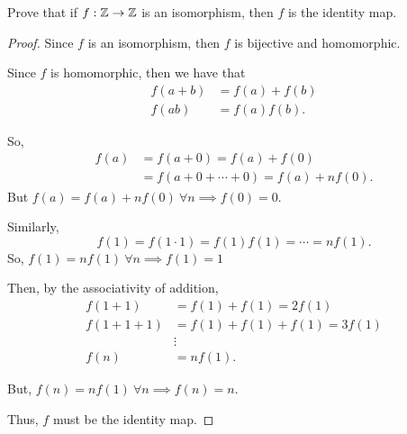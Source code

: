 \documentclass[../hw4]{subfiles}
\begin{document}
\begin{problem}
Prove that if $f:\mathbb{Z}\to \mathbb{Z}$ is an isomorphism, then $f$ is the identity map.
\end{problem}
\begin{proof}
	Since $f$ is an isomorphism, then  $f$ is bijective and homomorphic.

	Since $f$ is homomorphic, then we have that
	\begin{align*}
		f(a+b) & = f(a)+f(b) \\
		f(ab)  & = f(a)f(b)
		.\end{align*}

	So,
	\begin{align*}
		f(a) & =f(a+0)=f(a)+f(0)            \\
		     & =f(a+0+\cdots+0)=f(a)+n f(0)
		.\end{align*}
	But $f(a)=f(a)+n f(0)\ \forall n \implies f(0)=0$.

	Similarly,  \[
		f(1)=f(1\cdot 1) = f(1)f(1) = \cdots = n f(1)
		.\]
	So, $f(1)=nf(1)\ \forall n \implies f(1) = 1$

	Then, by the associativity of addition,
	\begin{align*}
		f(1+1)   & =f(1)+f(1)=2f(1)         \\
		f(1+1+1) & = f(1)+f(1)+f(1) = 3f(1) \\
		         & \vdots                   \\
		f(n)     & =nf(1)
		.\end{align*}

	But, $f(n)=n f(1)\ \forall n \implies f(n)=n$.

	Thus, $f$ must be the identity map.
\end{proof}
\end{document}
